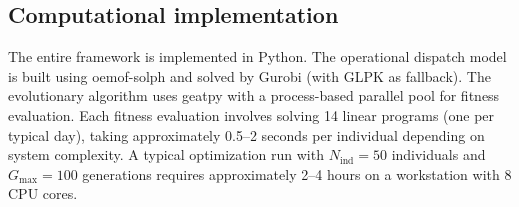 \subsection{Computational implementation}
\label{sec:implementation}

The entire framework is implemented in Python. The operational dispatch model is built using oemof-solph and solved by Gurobi (with GLPK as fallback). The evolutionary algorithm uses geatpy with a process-based parallel pool for fitness evaluation. Each fitness evaluation involves solving 14 linear programs (one per typical day), taking approximately 0.5--2 seconds per individual depending on system complexity. A typical optimization run with $N_{\text{ind}} = 50$ individuals and $G_{\text{max}} = 100$ generations requires approximately 2--4 hours on a workstation with 8 CPU cores.
